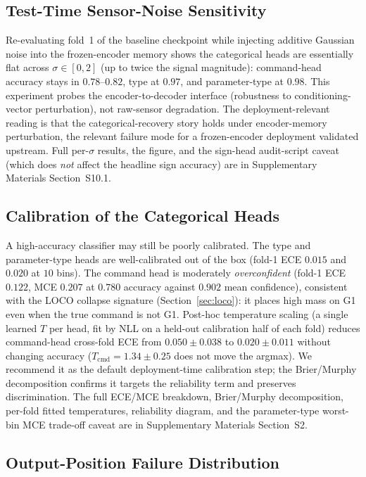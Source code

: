 \documentclass[sensors,article,submit,moreauthors,pdftex]{Definitions/mdpi}
\begin{document}
\subsection{Test-Time Sensor-Noise Sensitivity}
\label{sec:noise-sensitivity}

Re-evaluating fold~1 of the baseline checkpoint while injecting additive Gaussian noise into the frozen-encoder memory shows the categorical heads are essentially flat across $\sigma \in [0, 2]$ (up to twice the signal magnitude): command-head accuracy stays in $0.78$--$0.82$, type at $0.97$, and parameter-type at $0.98$. This experiment probes the encoder-to-decoder interface (robustness to conditioning-vector perturbation), not raw-sensor degradation. The deployment-relevant reading is that the categorical-recovery story holds under encoder-memory perturbation, the relevant failure mode for a frozen-encoder deployment validated upstream. Full per-$\sigma$ results, the figure, and the sign-head audit-script caveat (which does \emph{not} affect the headline sign accuracy) are in Supplementary Materials Section~S10.1.

\subsection{Calibration of the Categorical Heads}
\label{sec:calibration}

A high-accuracy classifier may still be poorly calibrated. The type and parameter-type heads are well-calibrated out of the box (fold-1 ECE $0.015$ and $0.020$ at $10$ bins). The command head is moderately \emph{overconfident} (fold-1 ECE $0.122$, MCE $0.207$ at $0.780$ accuracy against $0.902$ mean confidence), consistent with the LOCO collapse signature (Section~\ref{sec:loco}): it places high mass on G1 even when the true command is not G1. Post-hoc temperature scaling (a single learned $T$ per head, fit by NLL on a held-out calibration half of each fold) reduces command-head cross-fold ECE from $0.050 \pm 0.038$ to $0.020 \pm 0.011$ without changing accuracy ($T_{\text{cmd}} = 1.34 \pm 0.25$ does not move the argmax). We recommend it as the default deployment-time calibration step; the Brier/Murphy decomposition confirms it targets the reliability term and preserves discrimination. The full ECE/MCE breakdown, Brier/Murphy decomposition, per-fold fitted temperatures, reliability diagram, and the parameter-type worst-bin MCE trade-off caveat are in Supplementary Materials Section~S2.

\subsection{Output-Position Failure Distribution}
\label{sec:output-position-failure}
\end{document}

